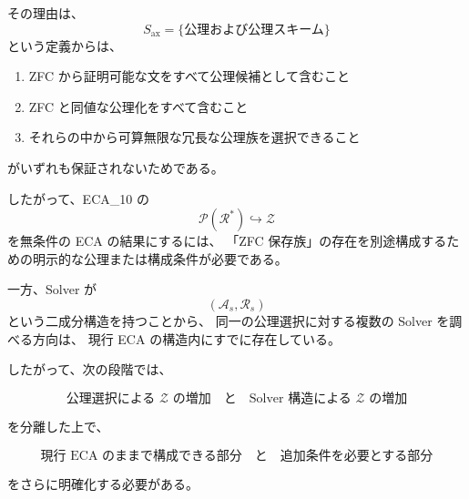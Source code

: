\documentclass[a4paper,11pt]{article}
\newcommand{\Ax}{S_{\mathrm{ax}}}
\begin{document}
その理由は、
\[
\Ax
=
\{\text{公理および公理スキーム}\}
\]
という定義からは、

\begin{enumerate}
\item ZFC から証明可能な文をすべて公理候補として含むこと
\item ZFC と同値な公理化をすべて含むこと
\item それらの中から可算無限な冗長な公理族を選択できること
\end{enumerate}
がいずれも保証されないためである。

したがって、ECA_10 の
\[
\mathcal{P}(\mathcal{R}^{*})\hookrightarrow\mathcal{Z}
\]
を無条件の ECA の結果にするには、
「ZFC 保存族」の存在を別途構成するための明示的な公理または構成条件が必要である。

一方、Solver が
\[
(\mathcal{A}_s,\mathcal{R}_s)
\]
という二成分構造を持つことから、
同一の公理選択に対する複数の Solver を調べる方向は、
現行 ECA の構造内にすでに存在している。

したがって、次の段階では、

\[
\boxed{
\text{公理選択による $\mathcal{Z}$ の増加}
\quad\text{と}\quad
\text{Solver 構造による $\mathcal{Z}$ の増加}
}
\]

を分離した上で、

\[
\boxed{
\text{現行 ECA のままで構成できる部分}
\quad\text{と}\quad
\text{追加条件を必要とする部分}
}
\]

をさらに明確化する必要がある。
\end{document}
